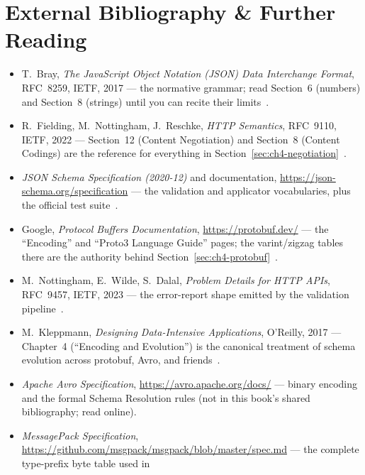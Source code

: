 \section{External Bibliography \& Further Reading}
\label{sec:ch4-bibliography}

\begin{itemize}
  \item T.~Bray, \emph{The JavaScript Object Notation (JSON) Data Interchange
        Format}, RFC~8259, IETF, 2017 --- the normative grammar; read Section~6
        (numbers) and Section~8 (strings) until you can recite their
        limits~\cite{rfc8259}.
  \item R.~Fielding, M.~Nottingham, J.~Reschke, \emph{HTTP Semantics}, RFC~9110,
        IETF, 2022 --- Section~12 (Content Negotiation) and Section~8 (Content
        Codings) are the reference for everything in
        Section~\ref{sec:ch4-negotiation}~\cite{rfc9110}.
  \item \emph{JSON Schema Specification (2020-12)} and documentation,
        \url{https://json-schema.org/specification} --- the validation and
        applicator vocabularies, plus the official test
        suite~\cite{jsonschemadocs}.
  \item Google, \emph{Protocol Buffers Documentation},
        \url{https://protobuf.dev/} --- the ``Encoding'' and ``Proto3 Language
        Guide'' pages; the varint/zigzag tables there are the authority behind
        Section~\ref{sec:ch4-protobuf}~\cite{protobufdocs}.
  \item M.~Nottingham, E.~Wilde, S.~Dalal, \emph{Problem Details for HTTP APIs},
        RFC~9457, IETF, 2023 --- the error-report shape emitted by the validation
        pipeline~\cite{rfc9457}.
  \item M.~Kleppmann, \emph{Designing Data-Intensive Applications}, O'Reilly,
        2017 --- Chapter~4 (``Encoding and Evolution'') is the canonical
        treatment of schema evolution across protobuf, Avro, and
        friends~\cite{kleppmann2017ddia}.
  \item \emph{Apache Avro Specification},
        \url{https://avro.apache.org/docs/} --- binary encoding and the formal
        Schema Resolution rules (not in this book's shared bibliography; read
        online).
  \item \emph{MessagePack Specification},
        \url{https://github.com/msgpack/msgpack/blob/master/spec.md} --- the
        complete type-prefix byte table used in

\end{itemize}
